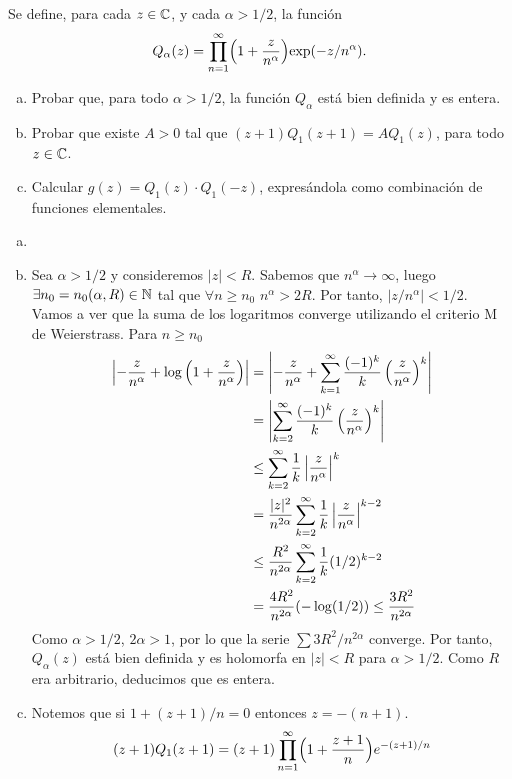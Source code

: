 \documentclass[twoside]{article}
\begin{document}
\begin{ejercicio}{9}
Se define, para cada $z\in \mathbb{C}$, y cada $\alpha >1/2$, la función
$$
Q_\alpha(z)=
\prod_{n=1}^\infty \Bigl(1+{z\over n^\alpha}\Bigl)\exp(-z/ n^\alpha).
$$
\begin{enumerate}[a)]
\item Probar que, para todo $\alpha>1/2$, la función $Q_\alpha$ está bien definida y es entera.
\item Probar que existe $A>0$ tal que $(z+1)Q_1(z+1) = AQ_1(z)$, para todo $z\in \mathbb{C}$.
\item Calcular $g(z)=Q_1(z)\cdot Q_1(-z)$, expresándola como combinación de funciones elementales.
\end{enumerate}
\end{ejercicio}
\begin{solucion}
\begin{enumerate}[a)]
\item[]
\item Sea $\alpha>1/2$ y consideremos $|z|<R$. Sabemos que $n^{\alpha}\to \infty$, luego $\exists n_0=n_0(\alpha,R) \in \mathbb{N}$ tal que $\forall n \geq n_0$ $n^\alpha > 2R$. Por tanto, $|z/n^\alpha|<1/2$. Vamos a ver que la suma de los logaritmos converge utilizando el criterio M de Weierstrass. Para $n\geq n_0$
\begin{align*}
\left\lvert-\frac{z}{n^\alpha}+\log\left(1+\frac{z}{n^\alpha}\right)\right\rvert&=\left\lvert-\frac{z}{n^\alpha}+\sum_{k=1}^\infty \frac{(-1)^k}{k}\left(\frac{z}{n^\alpha}\right)^k\right\rvert\\
&=\left\lvert\sum_{k=2}^\infty \frac{(-1)^k}{k}\left(\frac{z}{n^\alpha}\right)^k\right\rvert\\
&\leq\sum_{k=2}^\infty \frac{1}{k}\left\lvert\frac{z}{n^\alpha}\right\rvert^k\\
&= \frac{|z|^2}{n^{2\alpha}}\sum_{k=2}^\infty \frac{1}{k}\left\lvert\frac{z}{n^\alpha}\right\rvert^{k-2} \\
&\leq \frac{R^2}{n^{2\alpha}}\sum_{k=2}^\infty \frac{1}{k}(1/2)^{k-2}\\
&=\frac{4R^2}{n^{2\alpha}}(-\log(1/2)) \leq \frac{3R^2}{n^{2\alpha}}
\end{align*}
Como $\alpha>1/2$, $2\alpha>1$, por lo que la serie $\sum 3R^2/n^{2\alpha}$ converge. Por tanto, $Q_\alpha(z)$ está bien definida y es holomorfa en $|z|<R$ para $\alpha>1/2$. Como $R$ era arbitrario, deducimos que es entera.
\item Notemos que si $1+ (z+1)/n = 0$ entonces $z = -(n+1)$. 
\begin{align*}
(z+1)Q_1(z+1)&=(z+1)\prod_{n=1}^\infty \Bigl(1+{z+1\over n}\Bigl)e^{-(z+1)/ n}\\

\end{align*}
\end{enumerate}
\end{solucion}
\end{document}
